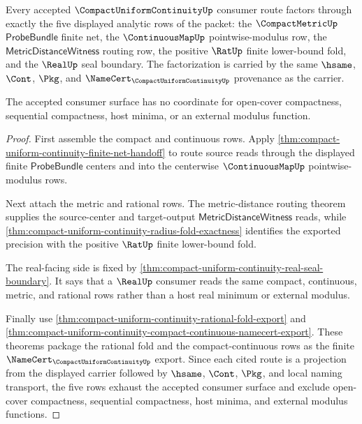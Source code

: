 \begin{theorem}
\label{thm:compact-uniform-continuity-finite-row-audit-boundary}
Every accepted $\CompactUniformContinuityUp$ consumer route factors through exactly the five displayed analytic rows of the packet: the $\CompactMetricUp$ $\mathsf{ProbeBundle}$ finite net, the $\ContinuousMapUp$ pointwise-modulus row, the $\mathsf{MetricDistanceWitness}$ routing row, the positive $\RatUp$ finite lower-bound fold, and the $\RealUp$ seal boundary. The factorization is carried by the same $\hsame$, $\Cont$, $\Pkg$, and $\NameCert_{\CompactUniformContinuityUp}$ provenance as the carrier.

The accepted consumer surface has no coordinate for open-cover compactness, sequential compactness, host minima, or an external modulus function.
\end{theorem}
\begin{proof}
First assemble the compact and continuous rows. Apply \autoref{thm:compact-uniform-continuity-finite-net-handoff} to route source reads through the displayed finite $\mathsf{ProbeBundle}$ centers and into the centerwise $\ContinuousMapUp$ pointwise-modulus rows.

Next attach the metric and rational rows. The metric-distance routing theorem supplies the source-center and target-output $\mathsf{MetricDistanceWitness}$ reads, while \autoref{thm:compact-uniform-continuity-radius-fold-exactness} identifies the exported precision with the positive $\RatUp$ finite lower-bound fold.

The real-facing side is fixed by \autoref{thm:compact-uniform-continuity-real-seal-boundary}. It says that a $\RealUp$ consumer reads the same compact, continuous, metric, and rational rows rather than a host real minimum or external modulus.

Finally use \autoref{thm:compact-uniform-continuity-rational-fold-export} and \autoref{thm:compact-uniform-continuity-compact-continuous-namecert-export}. These theorems package the rational fold and the compact-continuous rows as the finite $\NameCert_{\CompactUniformContinuityUp}$ export. Since each cited route is a projection from the displayed carrier followed by $\hsame$, $\Cont$, $\Pkg$, and local naming transport, the five rows exhaust the accepted consumer surface and exclude open-cover compactness, sequential compactness, host minima, and external modulus functions.
\end{proof}

